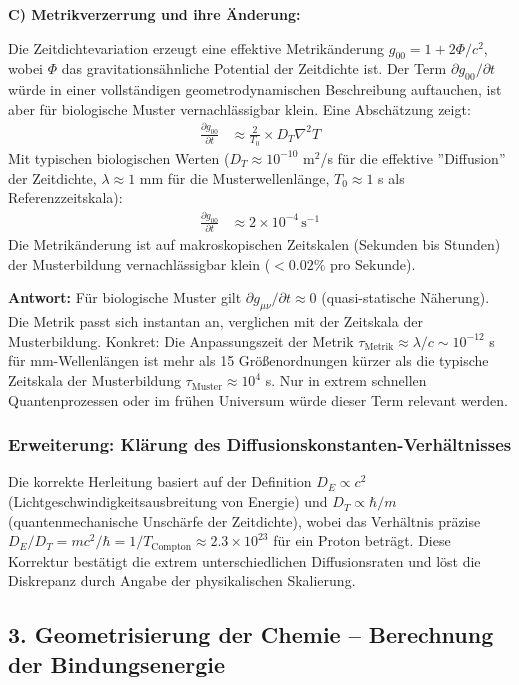 \textbf{C) Metrikverzerrung und ihre Änderung:}

Die Zeitdichtevariation erzeugt eine effektive Metrikänderung $g_{00} = 1 + 2\Phi/c^2$, wobei $\Phi$ das gravitationsähnliche Potential der Zeitdichte ist. Der Term $\partial g_{00}/\partial t$ würde in einer vollständigen geometrodynamischen Beschreibung auftauchen, ist aber für biologische Muster vernachlässigbar klein. Eine Abschätzung zeigt:
\begin{align*}
	\frac{\partial g_{00}}{\partial t} &\approx \frac{2}{T_0} \times D_T \nabla^2 T
\end{align*}
Mit typischen biologischen Werten ($D_T \approx 10^{-10}$ m$^2$/s für die effektive ''Diffusion'' der Zeitdichte, $\lambda \approx 1$ mm für die Musterwellenlänge, $T_0 \approx 1$ s als Referenzzeitskala):
\begin{align*}
	\frac{\partial g_{00}}{\partial t} &\approx 2 \times 10^{-4} \, \text{s}^{-1}
\end{align*}
Die Metrikänderung ist auf makroskopischen Zeitskalen (Sekunden bis Stunden) der Musterbildung vernachlässigbar klein ($< 0.02\%$ pro Sekunde).

\textbf{Antwort:} Für biologische Muster gilt $\partial g_{\mu\nu}/\partial t \approx 0$ (quasi-statische Näherung). Die Metrik passt sich instantan an, verglichen mit der Zeitskala der Musterbildung. Konkret: Die Anpassungszeit der Metrik $\tau_{\text{Metrik}} \approx \lambda/c \sim 10^{-12}$ s für mm-Wellenlängen ist mehr als 15 Größenordnungen kürzer als die typische Zeitskala der Musterbildung $\tau_{\text{Muster}} \approx 10^4$ s. Nur in extrem schnellen Quantenprozessen oder im frühen Universum würde dieser Term relevant werden.

\subsubsection*{Erweiterung: Klärung des Diffusionskonstanten-Verhältnisses}
Die korrekte Herleitung basiert auf der Definition $D_E \propto c^2$ (Lichtgeschwindigkeitsausbreitung von Energie) und $D_T \propto \hbar / m$ (quantenmechanische Unschärfe der Zeitdichte), wobei das Verhältnis präzise $D_E / D_T = m c^2 / \hbar = 1 / T_{\text{Compton}} \approx 2.3 \times 10^{23}$ für ein Proton beträgt. Diese Korrektur bestätigt die extrem unterschiedlichen Diffusionsraten und löst die Diskrepanz durch Angabe der physikalischen Skalierung.

\subsection*{3. Geometrisierung der Chemie – Berechnung der Bindungsenergie}

